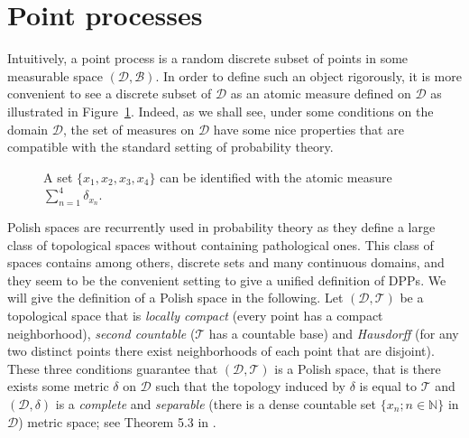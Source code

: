 \documentclass[twoside,11pt]{book}
\numberwithin{theorem}{chapter}
\numberwithin{definition}{chapter}
\numberwithin{proposition}{chapter}
\numberwithin{corollary}{chapter}
\numberwithin{example}{chapter}
\numberwithin{lemma}{chapter}
\numberwithin{assumption}{chapter}
\begin{document}
\section{Point processes}\label{sec:pointprocesses}

Intuitively, a point process is a random discrete subset of points in some  measurable space $(\mathcal{D}, \mathcal{B})$. In order to define such an object rigorously, it is more convenient to see a discrete subset of $\mathcal{D}$ as an atomic measure defined on $\mathcal{D}$ as illustrated in Figure~\ref{fig:pointprocess}. Indeed, as we shall see, under some conditions on the domain $\mathcal{D}$, the set of measures on $\mathcal{D}$ have some nice properties that are compatible with the standard setting of probability theory. 


\begin{figure}[]
\centering

 \caption{ A set $\{x_1, x_{2}, x_{3}, x_{4}\}$ can be identified with the atomic measure $\sum\limits_{n =1}^{4}\delta_{x_n}$. \label{fig:pointprocess}}
\end{figure}






Polish spaces are recurrently used in probability theory as they define a large class of topological spaces without containing pathological ones. 
This class of spaces contains among others, discrete sets and many continuous domains, and they seem to be the convenient setting to give a unified definition of DPPs. We will give the definition of a Polish space in the following. Let $(\mathcal{D},\mathcal{T})$ be a topological space that is \emph{locally compact} (every point has a compact neighborhood), \emph{second countable} ($\mathcal{T}$ has a countable base) and \emph{Hausdorff} (for any two distinct points there exist neighborhoods of each point that are disjoint).
 These three conditions guarantee that $(\mathcal{D},\mathcal{T})$ is a Polish space, that is there exists some metric $\delta$ on $\mathcal{D}$ such that the
topology induced by $\delta$ is equal to $\mathcal{T}$ and $(\mathcal{D},\delta)$ is a \emph{complete} and \emph{separable} (there is a dense countable set $\{x_{n}; n \in \mathbb{N}\}$ in $\mathcal{D}$)
metric space; see Theorem 5.3 in \citep{Kec95}.
\end{document}
